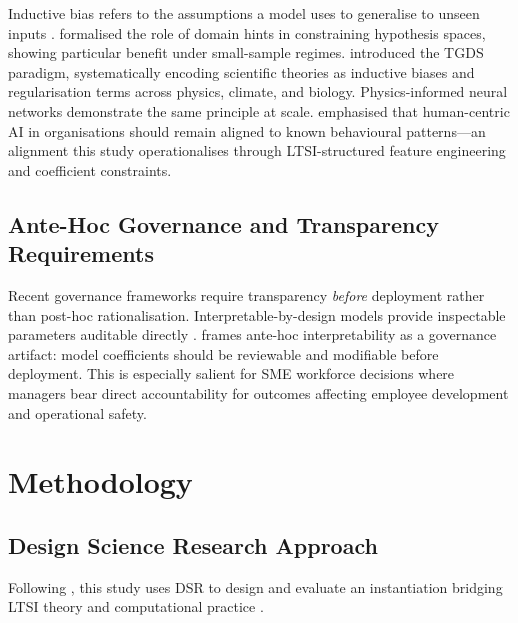 \documentclass[11pt,a4paper]{article}
\begin{document}
Inductive bias refers to the assumptions a model uses to generalise to unseen inputs \citep{mitchell1980}. \citet{abumostafa2012} formalised the role of domain hints in constraining hypothesis spaces, showing particular benefit under small-sample regimes. \citet{karpatne2017} introduced the TGDS paradigm, systematically encoding scientific theories as inductive biases and regularisation terms across physics, climate, and biology. Physics-informed neural networks \citep{raissi2019} demonstrate the same principle at scale. \citet{wu2025} emphasised that human-centric AI in organisations should remain aligned to known behavioural patterns---an alignment this study operationalises through LTSI-structured feature engineering and coefficient constraints.

\subsection{Ante-Hoc Governance and Transparency Requirements}

Recent governance frameworks require transparency \emph{before} deployment rather than post-hoc rationalisation. Interpretable-by-design models provide inspectable parameters auditable directly \citep{rudin2019}. \citet{cigi2023} frames ante-hoc interpretability as a governance artifact: model coefficients should be reviewable and modifiable before deployment. This is especially salient for SME workforce decisions where managers bear direct accountability for outcomes affecting employee development and operational safety.

\section{Methodology}

\subsection{Design Science Research Approach}

Following \citet{peffers2007}, this study uses DSR to design and evaluate an instantiation bridging LTSI theory and computational practice \citep{hevner2004}.
\end{document}

